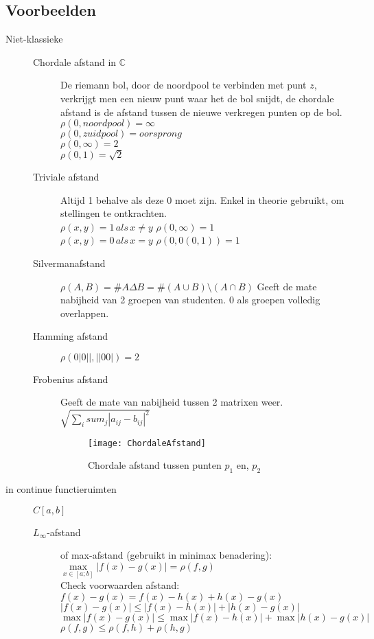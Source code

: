\subsection{Voorbeelden}
\begin{description}
\item[Niet-klassieke]

\begin{description}
\item[Chordale afstand in $\mathbb{C}$]
De riemann bol, door de noordpool te verbinden met punt $z$, verkrijgt men een nieuw punt waar het de bol snijdt, de chordale afstand is de afstand tussen de nieuwe verkregen punten op de bol. \\
$\rho(0,noordpool) = \infty$ \\
$\rho(0,zuidpool) = oorsprong$ \\
$\rho(0,\infty) = 2$ \\
$\rho(0,1) = \sqrt{2}$ 
\item[Triviale afstand] Altijd 1 behalve als deze 0 moet zijn. Enkel in theorie gebruikt, om stellingen te ontkrachten. \\
$ \rho(x,y)=1 \,als\, x \neq y$ $\rho(0,\infty)=1 $\\ 
$ \rho(x,y)=0 \,als\, x=y$ $ \rho(0,0(0,1)) = 1 $
\item[Silvermanafstand] $\rho(A,B) = \#A \Delta B = \#(A \cup B) \setminus (A \cap B) $ Geeft de mate nabijheid van 2 groepen van studenten. 0 als groepen volledig overlappen.
\item[Hamming afstand] $\rho(0|0||,||00|)=2$
\item[Frobenius afstand] Geeft de mate van nabijheid tussen 2 matrixen weer. $\sqrt{\sum_i sum_j | a_{ij} - b_{ij}|^2}$

\begin{figure}[h]
	\centering
	\texttt{[image: ChordaleAfstand]}
	\caption{Chordale afstand tussen punten $p_1$ en, $p_2$}
\end{figure}
\end{description}

\item[in continue functieruimten] $C[a,b]$
\begin{description}
\item[$L_\infty$-afstand] of max-afstand (gebruikt in minimax benadering): $\underset{x\in [a;b]}{\operatorname {max}}|f(x)-g(x)|=\rho(f,g) $\\
Check voorwaarden afstand: \\
$ f(x)-g(x)=f(x)-h(x)+h(x)-g(x)$ \\
$ |f(x)-g(x)| \leq|f(x)-h(x)|+ |h(x)-g(x)| $ \\
$\operatorname {max} |f(x)-g(x)| \leq \operatorname {max} |f(x)-h(x)|+ \operatorname {max} |h(x)-g(x)| $ \\
$\rho(f,g) \leq \rho(f,h)+\rho(h,g) $


\end{description}
\end{description}
